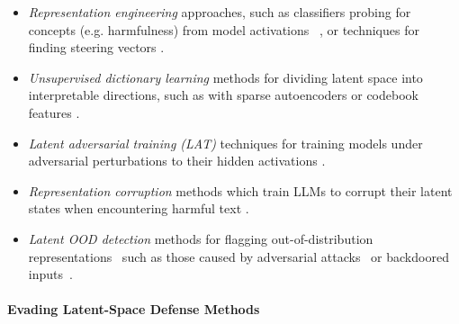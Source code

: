 \documentclass{article}
\begin{document}
\begin{itemize}
    \item \textit{Representation engineering} approaches, such as classifiers probing for concepts (e.g. harmfulness) from model activations ~\citep{alain2016understanding, belinkov2022probing, zou2023representation, mallen2023eliciting, arditi2024refusal, ball2024understanding, bricken2024using, macdiarmid2024sleeperagentprobes}, or techniques for finding steering vectors \citep{todd2023function, turner2023steering, panickssery2023steering, zhang2024truthx, mack2024deep}.
    \item \textit{Unsupervised dictionary learning} methods for dividing latent space into interpretable directions, such as with sparse autoencoders \citep{yun2021transformer, cunningham2023sparse, bricken2023monosemanticity,  braun2024identifying, gao2024scaling, templeton2024scaling, lieberum2024gemma} or codebook features \citep{tamkin2023codebook}.
    \item \textit{Latent adversarial training (LAT)} techniques for training models under adversarial perturbations to their hidden activations \citep{casper2024defending, sheshadri2024targeted}.
    \item \textit{Representation corruption} methods which train LLMs to corrupt their latent states when encountering harmful text \citep{zou2024improving, rosati2024representation, gandikota2024erasing, li2024llm}.
    \item \textit{Latent OOD detection} methods for flagging out-of-distribution representations~\citep{podolskiy2021revisiting, raghuram2021general} such as those caused by adversarial attacks~\citep{li2016adversarial, metzen2017detecting, feinman2017detecting, grosse2017statistical, amirian2018trace, ma2018characterizing, abusnaina2021adversarial, zhao2023adversarial} or backdoored inputs~\citep{chen2018detecting, tran2018spectral, gao2019strip, tang2021demon,  hayase2021spectre, chen2022expose, wang2022subspace, liu2022piccolo, ma2024beatrix, mo2024robust}.
\end{itemize}

\paragraph{Evading Latent-Space Defense Methods} 
\end{document}
